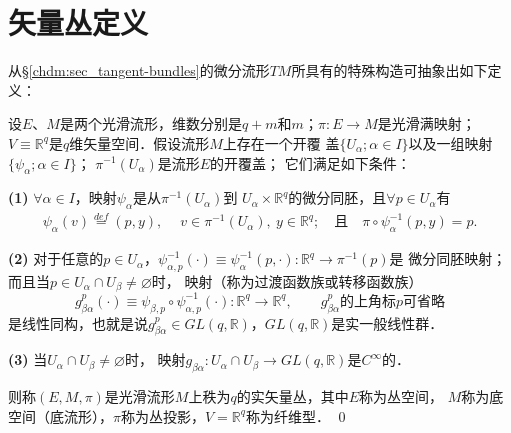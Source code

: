    


\section{矢量丛定义}\label{chfb:sec_vector-bundles}

从\S \ref{chdm:sec_tangent-bundles}的微分流形$TM$所具有的特殊构造可抽象出如下定义：
\begin{definition}\label{chfb:def_vector-bundles}
    设$E$、$M$是两个光滑流形，维数分别是$q+m$和$m$；$\pi:E\to M$是光滑满映射；
    $V\equiv \mathbb{R}^q$是$q$维矢量空间．假设流形$M$上存在一个开覆
    盖$\{U_\alpha; \alpha\in I\}$以及一组映射$\{\psi_\alpha; \alpha\in I\}$；
    $\pi^{-1}(U_\alpha)$是流形$E$的开覆盖；
    它们满足如下条件：
    
    {\bfseries (1)} $\forall \alpha \in I$，映射$\psi_\alpha$是从$\pi^{-1}(U_\alpha)$到
    $U_\alpha \times \mathbb{R}^q$的微分同胚，且$\forall p \in U_\alpha$有
    \begin{align*}
        \psi_\alpha\left(v\right) \overset{def}{=} \left(p, y \right),
        \quad \ v\in \pi^{-1} (U_\alpha),\ y \in \mathbb{R}^q ; 
        \quad \text{且}\quad
        \pi \circ \psi_\alpha^{-1} (p,y) = p.
    \end{align*}
    
    {\bfseries (2)} 对于任意的$p\in U_\alpha$，$\psi^{-1}_{\alpha,p}(\cdot)\equiv 
    \psi^{-1}_\alpha(p,\cdot):\mathbb{R}^q\to \pi^{-1}(p)$是
    微分同胚映射；而且当$p\in U_\alpha \cap U_\beta \neq \varnothing$时，
    映射（称为{\heiti 过渡函数族}或转移函数族）
    \begin{equation*}
        g^p_{\beta\alpha} (\cdot)
        \equiv \psi_{\beta,p} \circ \psi^{-1}_{\alpha,p}(\cdot ) : \mathbb{R}^q\to\mathbb{R}^q ,
        \qquad g^p_{\beta\alpha}\text{的上角标$p$可省略}
    \end{equation*}
    是线性同构，也就是说$g^p_{\beta\alpha}\in GL(q,\mathbb{R})$，$GL(q,\mathbb{R})$是{\kaishu 实}一般线性群．
    
    {\bfseries (3)} 当$U_\alpha \cap U_\beta \neq \varnothing$时，
    映射$g_{\beta\alpha}: U_\alpha \cap U_\beta \to GL(q,\mathbb{R})$是$C^\infty$的．
    
    则称$(E,M,\pi)$是光滑流形$M$上秩为$q$的实{\heiti 矢量丛}，其中$E$称为{\heiti 丛空间}，
    $M$称为{\heiti 底空间}（底流形），$\pi$称为{\heiti 丛投影}，$V=\mathbb{R}^q$称为{\heiti 纤维型}．
\qed
\end{definition}

